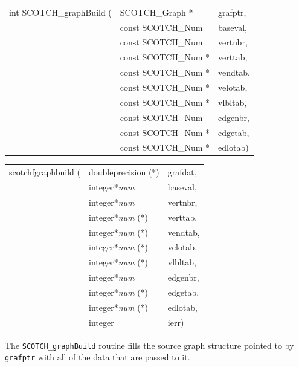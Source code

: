 \begin{itemize}
\progsyn

{\tt\begin{tabular}{l@{}ll}
int SCOTCH\_graphBuild ( & SCOTCH\_Graph *     & grafptr, \\
                         & const SCOTCH\_Num   & baseval, \\
                         & const SCOTCH\_Num   & vertnbr, \\
                         & const SCOTCH\_Num * & verttab, \\
                         & const SCOTCH\_Num * & vendtab, \\
                         & const SCOTCH\_Num * & velotab, \\
                         & const SCOTCH\_Num * & vlbltab, \\
                         & const SCOTCH\_Num   & edgenbr, \\
                         & const SCOTCH\_Num * & edgetab, \\
                         & const SCOTCH\_Num * & edlotab)
\end{tabular}}

{\tt\begin{tabular}{l@{}ll}
scotchfgraphbuild ( & doubleprecision (*)   & grafdat, \\
                    & integer*{\it num}     & baseval, \\
                    & integer*{\it num}     & vertnbr, \\
                    & integer*{\it num} (*) & verttab, \\
                    & integer*{\it num} (*) & vendtab, \\
                    & integer*{\it num} (*) & velotab, \\
                    & integer*{\it num} (*) & vlbltab, \\
                    & integer*{\it num}     & edgenbr, \\
                    & integer*{\it num} (*) & edgetab, \\
                    & integer*{\it num} (*) & edlotab, \\
                    & integer               & ierr)
\end{tabular}}

\progdes

The {\tt SCOTCH\_graphBuild} routine fills the source graph structure
pointed to by {\tt grafptr} with all of the data that are passed to it.


\end{itemize}

